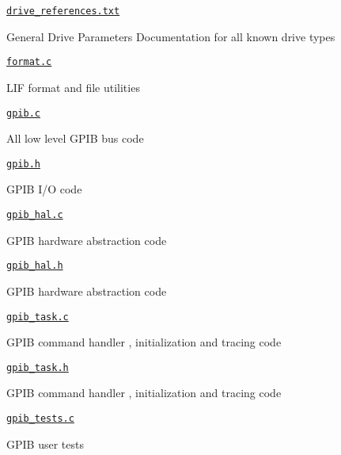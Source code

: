 \begin{DoxyItemize}
\begin{DoxyItemize}
\begin{DoxyItemize}
\end{DoxyItemize}
\item \href{gpib/drive_references.txt}{\tt drive\+\_\+references.\+txt}
\begin{DoxyItemize}
\item General Drive Parameters Documentation for all known drive types
\end{DoxyItemize}
\item \href{gpib/format.c}{\tt format.\+c}
\begin{DoxyItemize}
\item L\+IF format and file utilities
\end{DoxyItemize}
\item \href{gpib/gpib.c}{\tt gpib.\+c}
\begin{DoxyItemize}
\item All low level G\+P\+IB bus code
\end{DoxyItemize}
\item \href{gpib/gpib.h}{\tt gpib.\+h}
\begin{DoxyItemize}
\item G\+P\+IB I/O code
\end{DoxyItemize}
\item \href{gpib/gpib_hal.c}{\tt gpib\+\_\+hal.\+c}
\begin{DoxyItemize}
\item G\+P\+IB hardware abstraction code
\end{DoxyItemize}
\item \href{gpib/gpib_hal.h}{\tt gpib\+\_\+hal.\+h}
\begin{DoxyItemize}
\item G\+P\+IB hardware abstraction code
\end{DoxyItemize}
\item \href{gpib/gpib_task.c}{\tt gpib\+\_\+task.\+c}
\begin{DoxyItemize}
\item G\+P\+IB command handler , initialization and tracing code
\end{DoxyItemize}
\item \href{gpib/gpib_task.h}{\tt gpib\+\_\+task.\+h}
\begin{DoxyItemize}
\item G\+P\+IB command handler , initialization and tracing code
\end{DoxyItemize}
\item \href{gpib/gpib_tests.c}{\tt gpib\+\_\+tests.\+c}
\begin{DoxyItemize}
\item G\+P\+IB user tests

\end{DoxyItemize}
\end{DoxyItemize}
\end{DoxyItemize}
